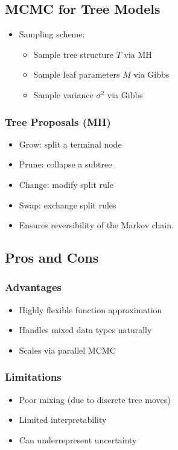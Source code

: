 \documentclass[12pt,oneside]{book}
\numberwithin{equation}{section}
\theoremstyle{definition}
\theoremstyle{plain}
\theoremstyle{remark}
\begin{document}
\subsection{MCMC for Tree Models}

\begin{itemize}
\item Sampling scheme:
\begin{itemize}
\item Sample tree structure $T$ via MH
\item Sample leaf parameters $M$ via Gibbs
\item Sample variance $\sigma^2$ via Gibbs
\end{itemize}
\end{itemize}

\subsubsection*{Tree Proposals (MH)}

\begin{itemize}
\item Grow: split a terminal node
\item Prune: collapse a subtree
\item Change: modify split rule
\item Swap: exchange split rules
\end{itemize}

\begin{itemize}
\item Ensures reversibility of the Markov chain.
\end{itemize}

\subsection{Pros and Cons}

\subsubsection*{Advantages}
\begin{itemize}
\item Highly flexible function approximation
\item Handles mixed data types naturally
\item Scales via parallel MCMC
\end{itemize}

\subsubsection*{Limitations}
\begin{itemize}
\item Poor mixing (due to discrete tree moves)
\item Limited interpretability
\item Can underrepresent uncertainty
\end{itemize}
\end{document}

